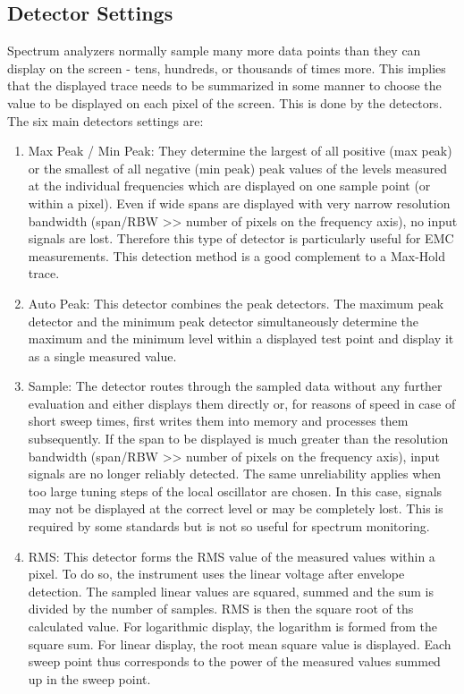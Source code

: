 \subsection{Detector Settings}
Spectrum analyzers normally sample many more data points than they can display on the screen - tens, hundreds, or thousands of times more. This implies that the displayed trace needs to be summarized in some manner to choose the value to be displayed on each pixel of the screen. This is done by the detectors. The six main detectors settings are:
\begin{enumerate}
  \item Max Peak / Min Peak: They determine the largest of all positive (max peak) or the smallest of all negative (min peak) peak values of the levels measured at the individual frequencies which are displayed on one sample point (or within a pixel). Even if wide spans are displayed with very narrow resolution bandwidth (span/\acs{RBW} >> number of pixels on the frequency axis), no input signals are lost. Therefore this type of detector is particularly useful for \acs{EMC} measurements. This detection method is a good complement to a Max-Hold trace.
  \item Auto Peak: This detector combines the peak detectors. The maximum peak detector and the minimum peak detector simultaneously determine the maximum and the minimum level within a displayed test point and display it as a single measured value. 
  \item Sample: The detector routes through the sampled data without any further evaluation and either displays them directly or, for reasons of speed in case of short sweep times, first writes them into memory and processes them subsequently. If the span to be displayed is much greater than the resolution bandwidth (span/\acs{RBW} >> number of pixels on the frequency axis), input signals are no longer reliably detected. The same unreliability applies when too large tuning steps of the local oscillator are chosen. In this case, signals may not be displayed at the correct level or may be completely lost. This is required by some standards but is not so useful for spectrum monitoring. 
  \item \ac{RMS}: This detector forms the \acs{RMS} value of the measured values within a pixel. To do so, the instrument uses the linear voltage after envelope detection. The sampled linear values are squared, summed and the sum is divided by the number of samples. \acs{RMS} is then the square root of ths calculated value. For logarithmic display, the logarithm is formed from the square sum. For linear display, the root mean square value is displayed. Each sweep point thus corresponds to the power of the measured values summed up in the sweep point. 

\end{enumerate}
